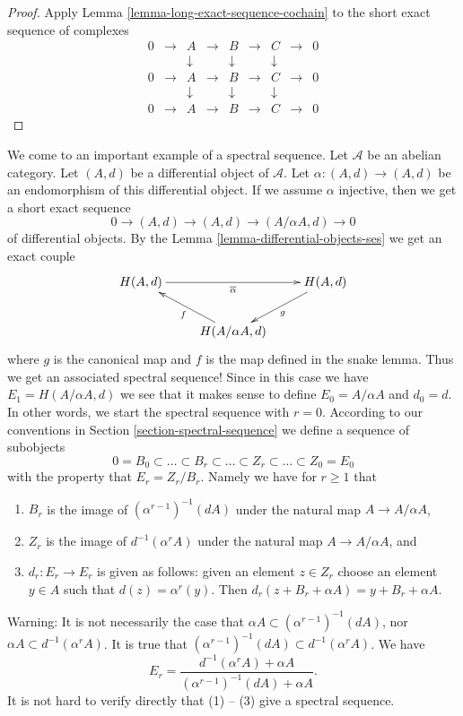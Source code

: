 \begin{proof}
Apply Lemma \ref{lemma-long-exact-sequence-cochain}
to the short exact sequence of complexes
$$
\begin{matrix}
0 & \to & A & \to & B & \to & C & \to & 0 \\
& & \downarrow & & \downarrow & & \downarrow \\
0 & \to & A & \to & B & \to & C & \to & 0 \\
& & \downarrow & & \downarrow & & \downarrow \\
0 & \to & A & \to & B & \to & C & \to & 0
\end{matrix}
$$
\end{proof}

\noindent
We come to an important example of a spectral sequence.
Let $\mathcal{A}$ be an abelian category.
Let $(A, d)$ be a differential object of $\mathcal{A}$.
Let $\alpha : (A, d) \to (A, d)$ be an endomorphism of this differential
object. If we assume $\alpha$ injective, then we get a short exact sequence
$$
0 \to (A, d) \to (A, d) \to (A/\alpha A, d) \to 0
$$
of differential objects. By the
Lemma \ref{lemma-differential-objects-ses} we get an exact couple
$$
\xymatrix{
H(A, d) \ar[rr]_{\overline{\alpha}} & & H(A, d) \ar[ld]^g \\
& H(A/\alpha A, d) \ar[lu]^f &
}
$$
where $g$ is the canonical map and $f$ is the map defined in the snake lemma.
Thus we get an associated spectral sequence!
Since in this case we have $E_1 = H(A/\alpha A, d)$ we
see that it makes sense to define $E_0 = A/\alpha A$
and $d_0 = d$. In other words, we start the spectral sequence
with $r = 0$. According to our conventions in
Section \ref{section-spectral-sequence} we define a sequence of subobjects
$$
0 = B_0 \subset \ldots \subset B_r \subset \ldots
\subset Z_r \subset \ldots \subset Z_0 = E_0
$$
with the property that $E_r = Z_r/B_r$. Namely we have
for $r \geq 1$ that
\begin{enumerate}
\item $B_r$ is the image of $(\alpha^{r - 1})^{-1}(d A)$
under the natural map $A \to A/\alpha A$,
\item $Z_r$ is the image of $d^{-1}(\alpha^r A)$
under the natural map $A \to A/\alpha A$, and
\item $d_r : E_r \to E_r$ is given as follows: given an element $z \in Z_r$
choose an element $y \in A$ such that $d(z) = \alpha^r(y)$. Then
$d_r(z + B_r + \alpha A) = y + B_r + \alpha A$.
\end{enumerate}
Warning: It is not necessarily the case that
$\alpha A \subset (\alpha^{r - 1})^{-1}(dA)$, nor
$\alpha A \subset d^{-1}(\alpha^r A)$. It is true that
$(\alpha^{r - 1})^{-1}(dA) \subset d^{-1}(\alpha^r A)$.
We have
$$
E_r
=
\frac{d^{-1}(\alpha^r A) + \alpha A}{(\alpha^{r - 1})^{-1}(dA) + \alpha A}.
$$
It is not hard to verify directly that (1) -- (3) give a spectral sequence.

